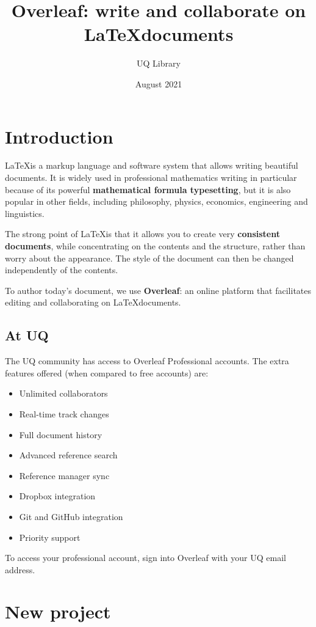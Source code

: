 \documentclass[12 pt]{article}
\title{Overleaf: write and collaborate on \LaTeX documents}
\author{UQ Library}
\date{August 2021}
\begin{document}
\maketitle

\section{Introduction}

\LaTeX is a markup language and software system that allows writing beautiful documents. It is widely used in professional mathematics writing in particular because of its powerful \textbf{mathematical formula typesetting}, but it is also popular in other fields, including philosophy, physics, economics, engineering and linguistics.

The strong point of \LaTeX is that it allows you to create very \textbf{consistent documents}, while concentrating on the contents and the structure, rather than worry about the appearance. The style of the document can then be changed independently of the contents.

To author today's document, we use \textbf{Overleaf}: an online platform that facilitates editing and collaborating on \LaTeX documents.

\subsection{At UQ}

The UQ community has access to Overleaf Professional accounts. The extra features offered (when compared to free accounts) are:
\begin{itemize}
    \item Unlimited collaborators
    \item Real-time track changes
    \item Full document history
    \item Advanced reference search
    \item Reference manager sync
    \item Dropbox integration
    \item Git and GitHub integration
    \item Priority support
\end{itemize}

To access your professional account, sign into Overleaf with your UQ email address.

\section{New project}
\end{document}
